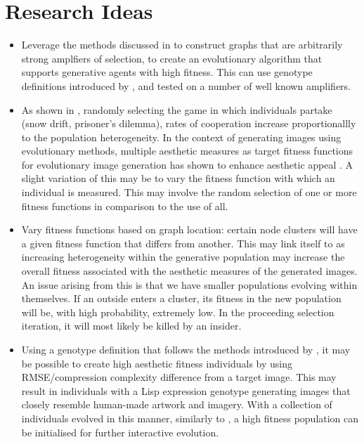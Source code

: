 \documentclass[10pt,a4paper]{article}
\begin{document}
\pagebreak
\section{Research Ideas}
\begin{itemize}
	\item Leverage the methods discussed in \cite{graph-amplifiers} to construct graphs that are arbitrarily strong amplfiers of selection, to create an evolutionary algorithm that supports generative agents with high fitness.
	This can use genotype definitions introduced by \cite{sims}, and tested on a number of well known amplifiers.
	
	\item As shown in \cite{mixed-games}, randomly selecting the game in which individuals partake (snow drift, prisoner's dilemma), rates of cooperation increase proportionallly to the population heterogeneity.
	In the context of generating images using evolutionary methods, multiple aesthetic measures as target fitness functions for evolutionary image generation has shown to enhance aesthetic appeal \cite{aesthetic-measures}.
	A slight variation of this may be to vary the fitness function with which an individual is measured.
	This may involve the random selection of one or more fitness functions in comparison to the use of all.
	
	\item Vary fitness functions based on graph location: certain node clusters will have a given fitness function that differs from another.
	This may link itself to \cite{mixed-games} as increasing heterogeneity within the generative population may increase the overall fitness associated with the aesthetic measures of the generated images.
	An issue arising from this is that we have smaller populations evolving within themselves.
	If an outside enters a cluster, its fitness in the new population will be, with high probability, extremely low.
	In the proceeding selection iteration, it will most likely be killed by an insider.
	
	\item Using a genotype definition that follows the methods introduced by \cite{sims}, it may be possible to create high aesthetic fitness individuals by using RMSE/compression complexity difference from a target image. 
	This may result in individuals with a Lisp expression genotype generating images that closely resemble human-made artwork and imagery.
	With a collection of individuals evolved in this manner, similarly to \cite{nevar}, a high fitness population can be initialised for further interactive evolution.
	

\end{itemize}
\end{document}
